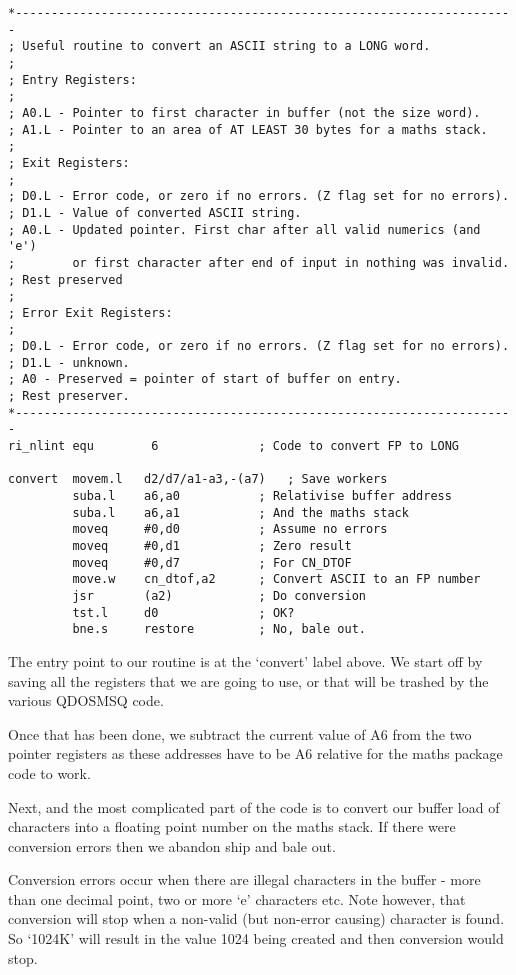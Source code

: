 \begin{lstlisting}[firstnumber=1,caption={ASCII to LONG Converter - Part 1}]
*----------------------------------------------------------------------
; Useful routine to convert an ASCII string to a LONG word.
;
; Entry Registers:
;
; A0.L - Pointer to first character in buffer (not the size word).
; A1.L - Pointer to an area of AT LEAST 30 bytes for a maths stack.
;
; Exit Registers:
;
; D0.L - Error code, or zero if no errors. (Z flag set for no errors).
; D1.L - Value of converted ASCII string.
; A0.L - Updated pointer. First char after all valid numerics (and 'e')
;        or first character after end of input in nothing was invalid.
; Rest preserved
;
; Error Exit Registers:
;
; D0.L - Error code, or zero if no errors. (Z flag set for no errors).
; D1.L - unknown.
; A0 - Preserved = pointer of start of buffer on entry.
; Rest preserver.
*----------------------------------------------------------------------
ri_nlint equ        6              ; Code to convert FP to LONG

convert  movem.l   d2/d7/a1-a3,-(a7)   ; Save workers
         suba.l    a6,a0           ; Relativise buffer address
         suba.l    a6,a1           ; And the maths stack
         moveq     #0,d0           ; Assume no errors
         moveq     #0,d1           ; Zero result
         moveq     #0,d7           ; For CN_DTOF
         move.w    cn_dtof,a2      ; Convert ASCII to an FP number
         jsr       (a2)            ; Do conversion
         tst.l     d0              ; OK?
         bne.s     restore         ; No, bale out.
\end{lstlisting}

The entry point to our routine is at the `convert' label above. We start off by
saving all the registers that we are going to use, or that will be trashed by
the various QDOSMSQ code. 

Once that has been done, we subtract the current value of A6 from the two
pointer registers as these addresses have to be A6 relative for the maths
package code to work.

Next, and the most complicated part of the code is to convert our buffer load
of characters into a floating point number on the maths stack. If there were
conversion errors then we abandon ship and bale out.

Conversion errors occur when there are illegal characters in the buffer -{} more
than one decimal point, two or more `e' characters etc. Note however, that
conversion will stop when a non-{}valid (but non-{}error causing) character is
found. So `1024K' will result in the value 1024 being created and then
conversion would stop.

